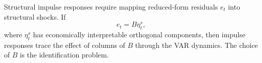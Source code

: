Structural impulse responses require mapping reduced-form residuals $e_t$ into structural shocks. If
\[
e_t=B\eta_t^{s},
\]
where $\eta_t^{s}$ has economically interpretable orthogonal components, then impulse responses trace the effect of columns of $B$ through the VAR dynamics. The choice of $B$ is the identification problem.


